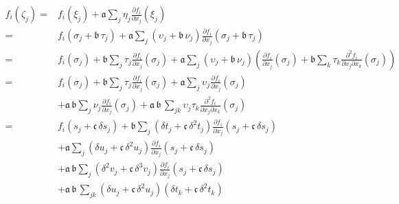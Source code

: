 \begin{align*}
f_{i} \! \left( \zeta_{j} \right)
%
=&
f_{i} \! \left( \xi_{j} \right) 
+ \mathfrak{a} \sum_{j} \eta_{j} \frac{ \partial f_{i} }{ \partial x_{j} } \! \left( \xi_{j} \right) 
\\
%
=&
f_{i} \! \left( \sigma_{j} + \mathfrak{b} \, \tau_{j} \right) 
+ \mathfrak{a} \sum_{j} \left( \upsilon_{j} + \mathfrak{b} \, \nu_{j} \right)
\frac{ \partial f_{i} }{ \partial x_{j} } 
\! \left( \sigma_{j} + \mathfrak{b} \, \tau_{j} \right) 
\\
%
=&
f_{i} \! \left( \sigma_{j} \right) + \mathfrak{b} 
\sum_{j} \tau_{j} \frac{ \partial f_{i} }{ \partial x_{j} } 
\! \left( \sigma_{j} \right)
+ \mathfrak{a} \sum_{j} \left( \upsilon_{j} + \mathfrak{b} \, \nu_{j} \right)
\left( \frac{ \partial f_{i} }{ \partial x_{j} } \! \left( \sigma_{j} \right)
+ \mathfrak{b} \sum_{k} \tau_{k}
\frac{ \partial^{2} f_{i} }{ \partial x_{j} \partial x_{k} } \! \left( \sigma_{j} \right) \right) 
\\
%
=&
f_{i} \! \left( \sigma_{j} \right) + \mathfrak{b} 
\sum_{j} \tau_{j} \frac{ \partial f_{i} }{ \partial x_{j} } 
\! \left( \sigma_{j} \right)
+ \mathfrak{a} \sum_{j}
\upsilon_{j} \frac{ \partial f_{i} }{ \partial x_{j} } \! \left( \sigma_{j} \right)
\\
& + \mathfrak{a} \, \mathfrak{b} \sum_{j}
 \nu_{j} \frac{ \partial f_{i} }{ \partial x_{j} } \! \left( \sigma_{j} \right)
+ \mathfrak{a} \, \mathfrak{b} \, \sum_{jk} \upsilon_{j} \tau_{k}
\frac{ \partial^{2} f_{i} }{ \partial x_{j} \partial x_{k} } \! \left( \sigma_{j} \right)
\\
%
=&
f_{i} \! \left( s_{j} + \mathfrak{c} \, \delta s_{j} \right) + \mathfrak{b} 
\sum_{j} \left( \delta t_{j} + \mathfrak{c} \, \delta^{2} t_{j} \right) 
\frac{ \partial f_{i} }{ \partial x_{j} } \! \left( s_{j} + \mathfrak{c} \, \delta s_{j} \right)
\\
&+ 
\mathfrak{a} \sum_{j}
\left( \delta u_{j} + \mathfrak{c} \, \delta^{2} u_{j} \right) 
\frac{ \partial f_{i} }{ \partial x_{j} } \! \left( s_{j} + \mathfrak{c} \, \delta s_{j} \right)
\\
& + \mathfrak{a} \, \mathfrak{b} \sum_{j}
\left( \delta^{2} v_{j} + \mathfrak{c} \, \delta^{3} v_{j} \right) \frac{ \partial f_{i} }{ \partial x_{j} } \! \left( s_{j} + \mathfrak{c} \, \delta s_{j} \right)
\\
&+ 
\mathfrak{a} \, \mathfrak{b} \, \sum_{jk} 
\left( \delta u_{j} + \mathfrak{c} \, \delta^{2} u_{j} \right) 
\left( \delta t_{k} + \mathfrak{c} \, \delta^{2} t_{k} \right)

\end{align*}
